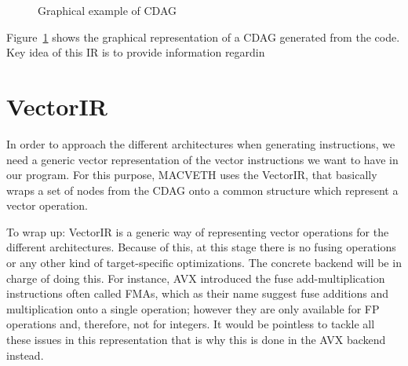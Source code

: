 \begin{figure}[h]
	\centering
{}
\caption{Graphical example of CDAG}
\label{fig:GraphCDAG}
\end{figure}

Figure~\ref{fig:GraphCDAG} shows the graphical representation of a CDAG 
generated from the code. Key idea of this IR is to provide information 
regardin

\section{VectorIR}
In order to approach the different architectures when generating instructions,
we need a generic vector representation of the vector instructions we want to
have in our program. For this purpose, MACVETH uses the VectorIR, that basically
wraps a set of nodes from the CDAG onto a common structure which represent a 
vector operation.

To wrap up: VectorIR is a generic way of representing vector operations for the 
different
architectures. Because of this, at this stage there is no fusing operations or
any other kind of target-specific optimizations. The concrete backend will be in
charge of doing this. For instance, AVX introduced the fuse add-multiplication
instructions often called FMAs, which as their name suggest fuse additions and
multiplication onto a single operation; however they are only available for FP
operations and, therefore, not for integers. It would be pointless to tackle
all these issues in this representation that is why this is done in the AVX
backend instead.

